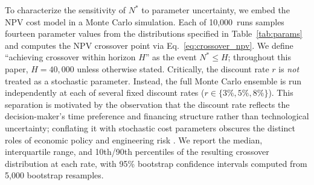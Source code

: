 \documentclass[preprint,12pt]{elsarticle}
\begin{document}
To characterize the sensitivity of $N^*$ to parameter uncertainty, we embed the NPV cost model in a Monte Carlo simulation. Each of 10{,}000~runs samples fourteen parameter values from the distributions specified in Table~\ref{tab:params} and computes the NPV crossover point via Eq.~\ref{eq:crossover_npv}. We define ``achieving crossover within horizon $H$'' as the event $N^* \leq H$; throughout this paper, $H = 40{,}000$ unless otherwise stated. Critically, the discount rate $r$ is \emph{not} treated as a stochastic parameter. Instead, the full Monte Carlo ensemble is run independently at each of several fixed discount rates ($r \in \{3\%, 5\%, 8\%\}$). This separation is motivated by the observation that the discount rate reflects the decision-maker's time preference and financing structure rather than technological uncertainty; conflating it with stochastic cost parameters obscures the distinct roles of economic policy and engineering risk \cite{arrow2014}. We report the median, interquartile range, and 10th/90th percentiles of the resulting crossover distribution at each rate, with 95\% bootstrap confidence intervals computed from 5{,}000 bootstrap resamples.
\end{document}
